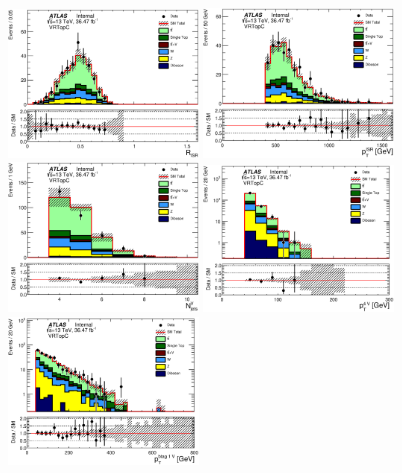\begin{figure}[htbp]
  \centering
    \includegraphics[width=0.45\textwidth]{figures/ttbar/postfit/CA_RISR_VRTopC}
    \includegraphics[width=0.45\textwidth]{figures/ttbar/postfit/CA_pTISR_VRTopC}
    \includegraphics[width=0.45\textwidth]{figures/ttbar/postfit/CA_NjV_VRTopC}
    \includegraphics[width=0.45\textwidth]{figures/ttbar/postfit/CA_pTjV4_VRTopC_log}
    \includegraphics[width=0.45\textwidth]{figures/ttbar/postfit/CA_pTbV1_VRTopC_log}

\end{figure}
